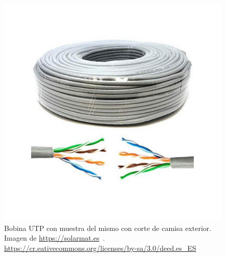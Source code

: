 \begin{figure}
    \centering
    \includegraphics[width=.6\textwidth]{img/bobina_UTP.pdf}
    \caption[Bobina UTP]{Bobina UTP con muestra del mismo con corte de camisa exterior. Imagen de \url{https://solarmat.es}~\cite{wiki:Creative}. \url{https://cr.eativecommons.org/licenses/by-sa/3.0/deed.es_ES} } \label{Img:Bobina UTP}
\end{figure}

